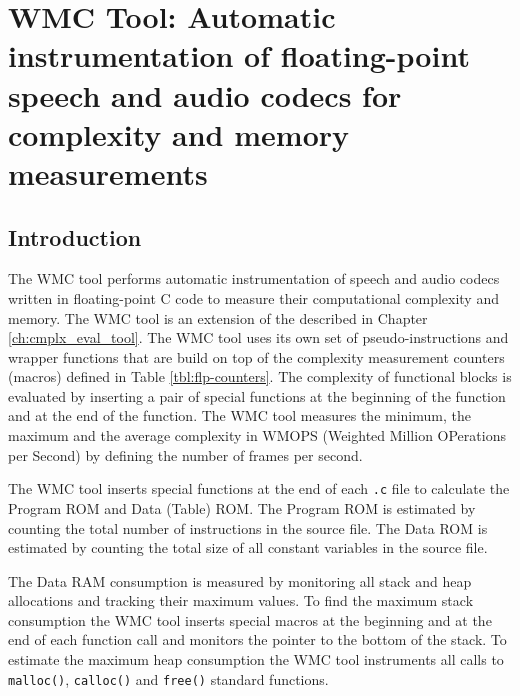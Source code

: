 %
\chapter{WMC Tool: Automatic instrumentation of floating-point speech
         and audio codecs for complexity and memory measurements}

\section{Introduction}

The WMC tool performs automatic instrumentation of speech and audio codecs written in floating-point C code to measure their computational complexity and memory. The WMC tool is an extension of the  described in Chapter \ref{ch:cmplx_eval_tool}. The WMC tool uses its own set of pseudo-instructions and wrapper functions that are build on top of the complexity measurement counters (macros) defined in Table \ref{tbl:flp-counters}. The complexity of functional blocks is evaluated by inserting a pair of special functions at the beginning of the function and at the end of the function. The WMC tool measures the minimum, the maximum and the average complexity in WMOPS (Weighted Million OPerations per Second) by defining the number of frames per second.

The WMC tool inserts special functions at the end of each \verb|.c| file to calculate the Program ROM and Data (Table) ROM. The Program ROM is estimated by counting the total number of instructions in the source file. The Data ROM is estimated by counting the total size of all constant variables in the source file.

The Data RAM consumption is measured by monitoring all stack and heap allocations and tracking their maximum values. To find the maximum stack consumption the WMC tool inserts special macros at the beginning and at the end of each function call and monitors the pointer to the bottom of the stack. To estimate the maximum heap consumption the WMC tool instruments all calls to \verb|malloc()|, \verb|calloc()| and \verb|free()| standard functions.

